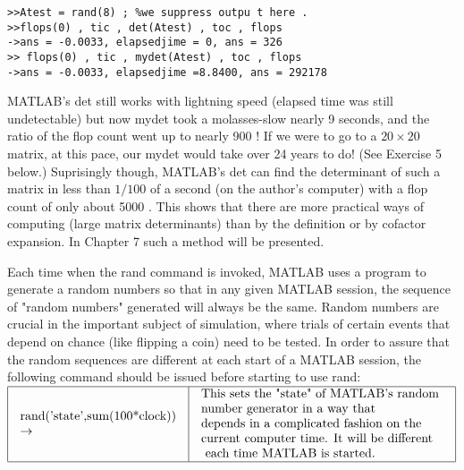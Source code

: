 \documentclass[../main.tex]{subfiles}
\begin{document}
\begin{verbatim}
>>Atest = rand(8) ; %we suppress outpu t here .
>>flops(0) , tic , det(Atest) , toc , flops
->ans = -0.0033, elapsedjime = 0, ans = 326 
>> flops(0) , tic , mydet(Atest) , toc , flops
->ans = -0.0033, elapsedjime =8.8400, ans = 292178 
\end{verbatim}

MATLAB's det still works with lightning speed (elapsed time was still undetectable) but now mydet took a molasses-slow nearly 9 seconds, and the ratio of the flop count went up to nearly 900 ! If we were to go to a $20 \times 20$ matrix, at this pace, our mydet would take over 24 years to do! (See Exercise 5 below.) Suprisingly though, MATLAB's det can find the determinant of such a matrix in less than $1 / 100$ of a second (on the author's computer) with a flop count of only about 5000 . This shows that there are more practical ways of computing (large matrix determinants) than by the definition or by cofactor expansion. In Chapter 7 such a method will be presented.

Each time when the rand command is invoked, MATLAB uses a program to generate a random numbers so that in any given MATLAB session, the sequence of "random numbers" generated will always be the same. Random numbers are crucial in the important subject of simulation, where trials of certain events that depend on chance (like flipping a coin) need to be tested. In order to assure that the random sequences are different at each start of a MATLAB session, the following command should be issued before starting to use rand:\\

$
\begin{array}{|l|l|}
\hline \begin{array}{l}
\text {rand('state',sum(100*clock))}\\
\rightarrow
\end{array} & \begin{array}{l}
\text {This sets the "state" of MATLAB's random } \\
\text {number generator in a way that}\\
\text {depends in a complicated fashion on the} \\
\text {current computer time. It will be different}\\
\text { each time MATLAB is started.} 
\end{array} \\
\hline
\end{array}
$ \\
\end{document}
